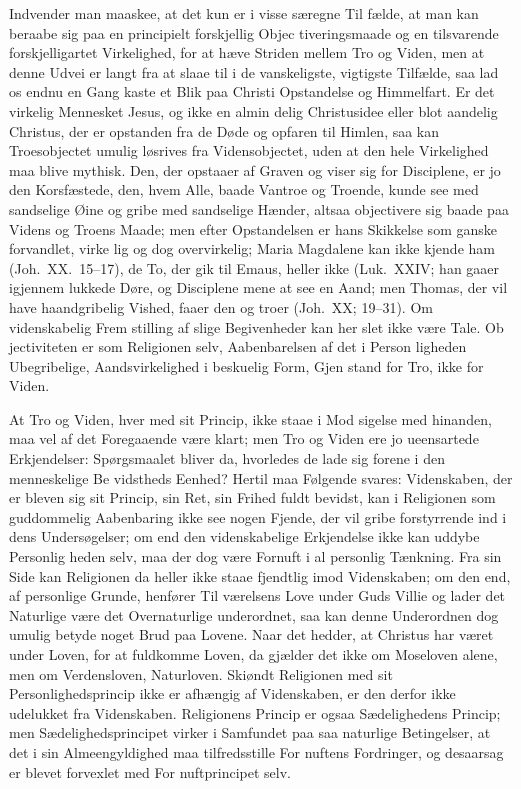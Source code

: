 \documentclass[12pt,a4paper]{article}
\newcommand{\opage}[1]{\marginnote{\footnotesize\textit{[#1]}}}
\begin{document}
Indvender man maaskee, at det kun er i visse særegne Til\-%
fælde, at man kan beraabe sig paa en principielt forskjellig Objec\-%
tiveringsmaade og en tilsvarende forskjelligartet Virkelighed, for
at hæve Striden mellem Tro og Viden, men at denne Udvei er
langt fra at slaae til i de vanskeligste, vigtigste Tilfælde, saa lad
os endnu en Gang kaste et Blik paa Christi Opstandelse og
Himmelfart. Er det virkelig Mennesket Jesus, og ikke en almin\-%
delig Christusidee eller blot aandelig Christus, der er opstanden
fra de Døde og opfaren til Himlen, saa kan Troesobjectet umulig
løsrives fra Vidensobjectet, uden at den hele Virkelighed maa blive
mythisk. Den, der opstaaer af Graven og viser sig for Disciplene,
er jo den Korsfæstede, den, hvem Alle, baade Vantroe og Troende,
kunde see med sandselige Øine og gribe med sandselige Hænder,
altsaa objectivere sig baade paa Videns og Troens Maade; men
efter Opstandelsen er hans Skikkelse som ganske forvandlet, virke\-%
lig og dog overvirkelig; Maria Magdalene kan ikke kjende ham
(Joh.\ XX.\ 15--17), de To, der gik til Emaus, heller ikke (Luk.\
XXIV; han gaaer igjennem lukkede Døre, og Disciplene mene at
see en Aand; men Thomas, der vil have haandgribelig Vished,
faaer den og troer (Joh.\ XX; 19--31). Om videnskabelig Frem\-%
stilling af slige Begivenheder kan her slet ikke være Tale. Ob\-%
jectiviteten er som Religionen selv, Aabenbarelsen af det i Person\-%
ligheden Ubegribelige, Aandsvirkelighed i beskuelig Form, Gjen\-%
stand for Tro, ikke for Viden.

At Tro og Viden, hver med sit Princip, ikke staae i Mod\-%
sigelse med hinanden, maa vel af det Foregaaende være klart;
\opage{54}men Tro og Viden ere jo ueensartede Erkjendelser: Spørgsmaalet
bliver da, hvorledes de lade sig forene i den menneskelige Be\-%
vidstheds Eenhed? Hertil maa Følgende svares: Videnskaben,
der er bleven sig sit Princip, sin Ret, sin Frihed fuldt bevidst,
kan i Religionen som guddommelig Aabenbaring ikke see nogen
Fjende, der vil gribe forstyrrende ind i dens Undersøgelser; om
end den videnskabelige Erkjendelse ikke kan uddybe Personlig\-%
heden selv, maa der dog være Fornuft i al personlig Tænkning.
Fra sin Side kan Religionen da heller ikke staae fjendtlig imod
Videnskaben; om den end, af personlige Grunde, henfører Til\-%
værelsens Love under Guds Villie og lader det Naturlige være
det Overnaturlige underordnet, saa kan denne Underordnen dog
umulig betyde noget Brud paa Lovene. Naar det hedder, at
Christus har været under Loven, for at fuldkomme Loven, da
gjælder det ikke om Moseloven alene, men om Verdensloven,
Naturloven. Skiøndt Religionen med sit Personlighedsprincip ikke
er afhængig af Videnskaben, er den derfor ikke udelukket fra
Videnskaben. Religionens Princip er ogsaa Sædelighedens Princip;
men Sædelighedsprincipet virker i Samfundet paa saa naturlige
Betingelser, at det i sin Almeengyldighed maa tilfredsstille For\-%
nuftens Fordringer, og desaarsag er blevet forvexlet med For\-%
nuftprincipet selv.
\end{document}
